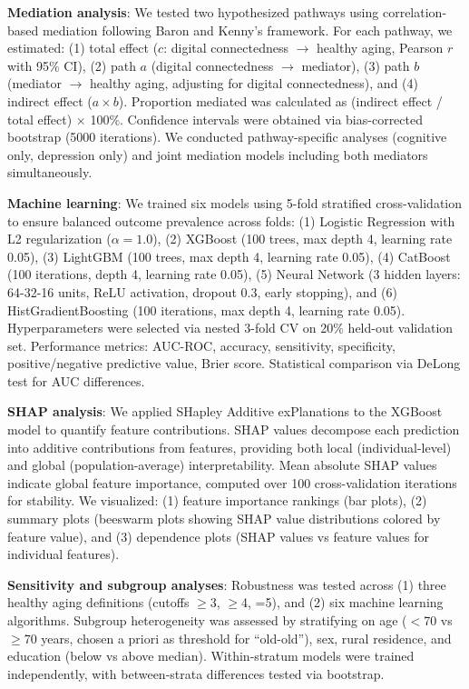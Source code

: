 \documentclass[10pt]{article}
\begin{document}
\textbf{Mediation analysis}: We tested two hypothesized pathways using correlation-based mediation following Baron and Kenny's framework. For each pathway, we estimated: (1) total effect ($c$: digital connectedness $\rightarrow$ healthy aging, Pearson $r$ with 95\% CI), (2) path $a$ (digital connectedness $\rightarrow$ mediator), (3) path $b$ (mediator $\rightarrow$ healthy aging, adjusting for digital connectedness), and (4) indirect effect ($a \times b$). Proportion mediated was calculated as (indirect effect / total effect) $\times$ 100\%. Confidence intervals were obtained via bias-corrected bootstrap (5000 iterations). We conducted pathway-specific analyses (cognitive only, depression only) and joint mediation models including both mediators simultaneously.

\textbf{Machine learning}: We trained six models using 5-fold stratified cross-validation to ensure balanced outcome prevalence across folds: (1) Logistic Regression with L2 regularization ($\alpha=1.0$), (2) XGBoost (100 trees, max depth 4, learning rate 0.05), (3) LightGBM (100 trees, max depth 4, learning rate 0.05), (4) CatBoost (100 iterations, depth 4, learning rate 0.05), (5) Neural Network (3 hidden layers: 64-32-16 units, ReLU activation, dropout 0.3, early stopping), and (6) HistGradientBoosting (100 iterations, max depth 4, learning rate 0.05). Hyperparameters were selected via nested 3-fold CV on 20\% held-out validation set. Performance metrics: AUC-ROC, accuracy, sensitivity, specificity, positive/negative predictive value, Brier score. Statistical comparison via DeLong test for AUC differences.

\textbf{SHAP analysis}: We applied SHapley Additive exPlanations to the XGBoost model to quantify feature contributions. SHAP values decompose each prediction into additive contributions from features, providing both local (individual-level) and global (population-average) interpretability. Mean absolute SHAP values indicate global feature importance, computed over 100 cross-validation iterations for stability. We visualized: (1) feature importance rankings (bar plots), (2) summary plots (beeswarm plots showing SHAP value distributions colored by feature value), and (3) dependence plots (SHAP values vs feature values for individual features).

\textbf{Sensitivity and subgroup analyses}: Robustness was tested across (1) three healthy aging definitions (cutoffs $\geq$3, $\geq$4, =5), and (2) six machine learning algorithms. Subgroup heterogeneity was assessed by stratifying on age ($<$70 vs $\geq$70 years, chosen a priori as threshold for ``old-old''), sex, rural residence, and education (below vs above median). Within-stratum models were trained independently, with between-strata differences tested via bootstrap.
\end{document}
